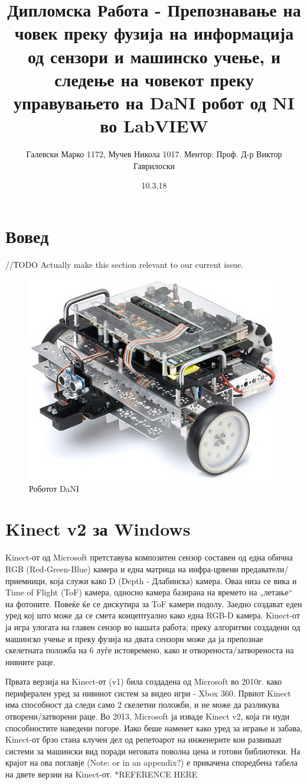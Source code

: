 \documentclass{article}
\title{Дипломска Работа - Препознавање на човек преку фузија на информација од сензори и машинско учење, и следење на човекот
				преку управувањето на  DaNI робот од NI во LabVIEW}
\date{10.3.18}
\author{Галевски Марко 1172, Мучев Никола 1017.		Ментор: Проф. Д-р Виктор Гаврилоски}
\begin{document}
    \maketitle{}
    \newpage
    \tableofcontents
    \newpage
    
\section{Вовед}
//ТODO Actually make this section relevant to our current issue.
\begin{figure}[H]
\includegraphics[width=0.75\linewidth]{./images/dani_isometric.jpg}
\centering
\caption{Роботот DaNI}
\label{fig:dani_isometric.jpg}
\end{figure} 

\newpage
\section{Kinect v2 за Windows}
Kinect-от од Microsoft претставува композитен сензор составен од една обична RGB (Red-Green-Blue) камера и една матрица на инфра-црвени предаватели/приемници, која служи како D (Depth - Длабинска) камера. Оваа низа се вика и Time of Flight (ToF) камера, односно камера базирана на времето на „летање“ на фотоните. Повеќе ќе се дискутира за ToF камери подолу. Заедно создават еден уред кој што може да се смета концептуално како една RGB-D камера. Kinect-от ја игра улогата на главен сензор во нашата работа; преку алгоритми создадени од машинско учење и преку фузија на двата сензори може да ја препознае скелетната положба на 6 луѓе истовремено, како и отвореноста/затвореноста на нивните раце.

Првата верзија на Kinect-от (v1) била создадена од Microsoft во 2010г. како периферален уред за нивниот систем за видео игри - Xbox 360. Првиот Kinect има способност да следи само 2 скелетни положби, и не може да разликува отворени/затворени раце. Во 2013, Microsoft ја изваде Kinect v2, која ги нуди способностите наведени погоре. Иако беше наменет како уред за играње и забава, Kinect-от брзо стана клучен дел од репетоарот на инженерите кои развиваат системи за машински вид поради неговата поволна цена и готови библиотеки. На крајот на ова поглавје (Note: or in an appendix?) е прикачена споредбена табела на двете верзии на Kinect-от.
*REFERENCE HERE 
\end{document}
